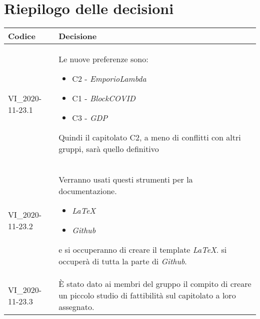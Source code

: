 \section{Riepilogo delle decisioni}
\setcounter{table}{-1}
{

\centering
\renewcommand{\arraystretch}{1.5}
\begin{longtable}{>{\centering}p{} >{}p{}}
\rowcolor{azzurro1}
\textbf{Codice} &
\centerline{\textbf{Decisione}}\\
\endhead

VI{\_}2020-11-23.1 & Le nuove preferenze sono:

\begin{itemize}
\item C2 - \textit{EmporioLambda}
\item C1 - \textit{BlockCOVID}
\item C3 - \textit{GDP}
\end{itemize}
Quindi il capitolato C2, a meno di conflitti con altri gruppi, sarà quello definitivo\\
VI{\_}2020-11-23.2 & Verranno usati questi strumenti per la documentazione.
\begin{itemize}
\item \textit{LaTeX}
\item \textit{Github}
\end{itemize}
\SB{} e \NM{} si occuperanno di creare il template \textit{LaTeX}. \NM{} si occuperà di tutta la parte di \textit{Github}.\\
VI{\_}2020-11-23.3 & È stato dato ai membri del gruppo il compito di creare un piccolo studio di fattibilità sul capitolato a loro assegnato.
\end{longtable}
}